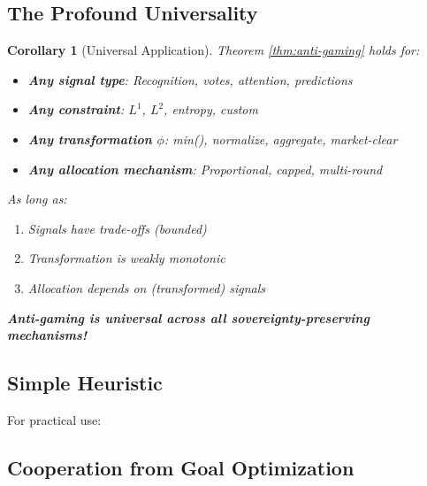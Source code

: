 \documentclass[11pt,a4paper]{article}
\newtheorem{corollary}[theorem]{Corollary}
\theoremstyle{definition}
\theoremstyle{remark}
\begin{document}
\subsection{The Profound Universality}

\begin{corollary}[Universal Application]
Theorem \ref{thm:anti-gaming} holds for:
\begin{itemize}
\item \textbf{Any signal type}: Recognition, votes, attention, predictions
\item \textbf{Any constraint}: $L^1$, $L^2$, entropy, custom
\item \textbf{Any transformation $\phi$}: min(), normalize, aggregate, market-clear
\item \textbf{Any allocation mechanism}: Proportional, capped, multi-round
\end{itemize}

As long as:
\begin{enumerate}
\item Signals have trade-offs (bounded)
\item Transformation is weakly monotonic
\item Allocation depends on (transformed) signals
\end{enumerate}

\textbf{Anti-gaming is universal across all sovereignty-preserving mechanisms!}
\end{corollary}

\subsection{Simple Heuristic}

For practical use:

\begin{center}
\end{center}

\subsection{Cooperation from Goal Optimization}
\end{document}

